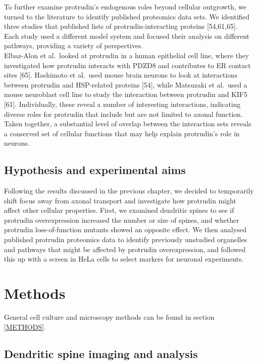 \documentclass[
  12pt,
  a4paper,
]{book}
\begin{document}
To further examine protrudin's endogenous roles beyond cellular outgrowth, we turned to the literature to identify published proteomics data sets. We identified three studies that published lists of protrudin-interacting proteins {[}54,61,65{]}. Each study used a different model system and focused their analysis on different pathways, providing a variety of perspectives.\\
Elbaz-Alon et al.~looked at protrudin in a human epithelial cell line, where they investigated how protrudin interacts with PDZD8 and contributes to ER contact sites {[}65{]}. Hashimoto et al.~used mouse brain neurons to look at interactions between protrudin and HSP-related proteins {[}54{]}, while Matsuzaki et al.~used a mouse neuroblast cell line to study the interaction between protrudin and KIF5 {[}61{]}. Individually, these reveal a number of interesting interactions, indicating diverse roles for protrudin that include but are not limited to axonal function. Taken together, a substantial level of overlap between the interaction sets reveals a conserved set of cellular functions that may help explain protrudin's role in neurons.

\subsection{Hypothesis and experimental aims}\label{hypothesis-and-experimental-aims-1}

Following the results discussed in the previous chapter, we decided to temporarily shift focus away from axonal transport and investigate how protrudin might affect other cellular properties. First, we examined dendritic spines to see if protrudin overexpression increased the number or size of spines, and whether protrudin loss-of-function mutants showed an opposite effect. We then analysed published protrudin proteomics data to identify previously unstudied organelles and pathways that might be affected by protrudin overexpression, and followed this up with a screen in HeLa cells to select markers for neuronal experiments.

\section{Methods}\label{methods-1}

General cell culture and microscopy methods can be found in section \ref{METHODS}.

\subsection{Dendritic spine imaging and analysis}\label{dendritic-spine-imaging-and-analysis}
\end{document}
